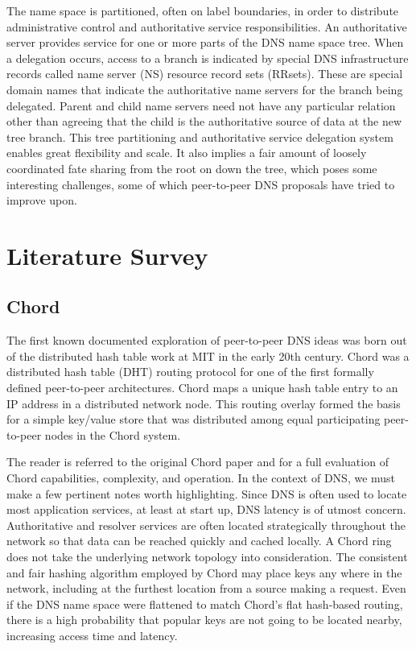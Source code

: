 \documentclass[sigconf]{acmart}
\begin{document}
The name space is partitioned, often on label boundaries, in order to
distribute administrative control and authoritative service
responsibilities.  An authoritative server provides service for one or
more parts of the DNS name space tree.  When a delegation occurs, access
to a branch is indicated by special DNS infrastructure records called
name server (NS) resource record sets (RRsets).  These are special
domain names that indicate the authoritative name servers for the branch
being delegated.  Parent and child name servers need not have any
particular relation other than agreeing that the child is the
authoritative source of data at the new tree branch.  This tree
partitioning and authoritative service delegation system enables great
flexibility and scale.  It also implies a fair amount of loosely
coordinated fate sharing from the root on down the tree, which poses
some interesting challenges, some of which peer-to-peer DNS proposals
have tried to improve upon.

\section{Literature Survey}

\subsection{Chord}

The first known documented exploration of peer-to-peer DNS ideas was
born out of the distributed hash table work at MIT in the early 20th
century.  Chord was a distributed hash table (DHT) routing protocol for
one of the first formally defined peer-to-peer
architectures.\cite{stoica_chord:_2001}  Chord maps a unique hash table
entry to an IP address in a distributed network node.  This routing
overlay formed the basis for a simple key/value store that was
distributed among equal participating peer-to-peer nodes in the Chord
system.

The reader is referred to the original Chord paper and
\cite{kshemkalyani_distributed_2011} for a full evaluation of Chord
capabilities, complexity, and operation.  In the context of DNS, we must
make a few pertinent notes worth highlighting.  Since DNS is often used
to locate most application services, at least at start up, DNS latency
is of utmost concern.  Authoritative and resolver services are often
located strategically throughout the network so that data can be reached
quickly and cached locally.  A Chord ring does not take the underlying
network topology into consideration.  The consistent and fair hashing
algorithm employed by Chord may place keys any where in the network,
including at the furthest location from a source making a request.  Even
if the DNS name space were flattened to match Chord's flat hash-based
routing, there is a high probability that popular keys are not going to
be located nearby, increasing access time and latency.
\end{document}
